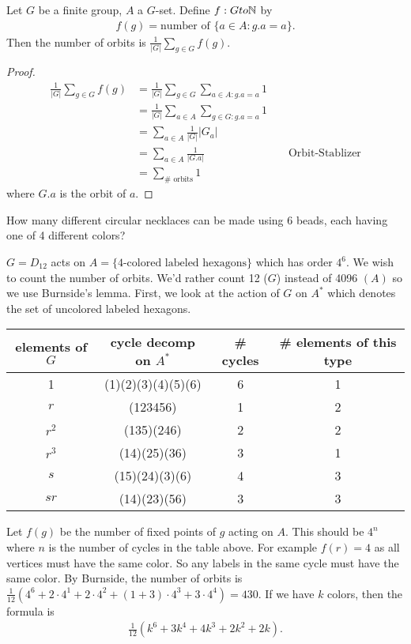\documentclass[12pt,class=article,crop=false]{standalone}
\begin{document}
\begin{lem}[Burnside]
Let $ G$ be a finite group,  $ A$ a $ G$-set. Define $ f: G to \mathbb{N}$ by
\begin{align*}
	f(g) = \text{number of } \{a \in A: g.a = a\}.  
\end{align*}
Then the number of orbits is $ \frac{1}{|G|} \sum_{g \in G} f(g)$.
\end{lem}
\begin{proof}
\begin{align*}
	\frac{1}{|G|} \sum_{g \in G} f(g) &= \frac{1}{|G|} \sum_{g \in G} \sum_{a \in A: g.a=a} 1\\
	&= \frac{1}{|G|} \sum_{a \in A} \sum_{g \in G: g.a=a} 1 \\
	&= \sum_{a \in A} \frac{1}{|G|} |G_a| \\
	&= \sum_{ a \in A} \frac{1}{|G.a|} && \text{ Orbit-Stablizer} \\
	&= \sum_{ \# \text{ orbits}} 1
\end{align*}
where $ G.a$ is the orbit of  $ a$.
\end{proof}

\begin{eg}[1]
How many different circular necklaces can be made using 6 beads, each having one of 4 different colors?

$ G= D_{12}$ acts on $ A= \{ \text{4-colored labeled hexagons} \} $ which has order $ 4^{6}$. We wish to count the number of orbits. We'd rather count 12 ($ G$) instead of 4096 $ (A)$ so we use Burnside's lemma. First, we look at the action of $ G$ on  $ A^* $ which denotes the set of uncolored labeled hexagons.
\begin{table}[H]
	\centering
	\begin{tabular}{c|c|c|c}
		elements of $ G$& cycle decomp on $ A^* $ & \# cycles & # elements of this type\\
		\hline
		\hline
		1&(1)(2)(3)(4)(5)(6)& 6 & 1\\
		\hline
		$ r$& (123456)&1&2\\
		\hline
		$ r^2$ & (135)(246) & 2 &2\\
		\hline
		$ r^3$ & (14)(25)(36) & 3&1\\
		\hline
		$ s$& (15)(24)(3)(6)&4&3\\
		\hline
		$ s r$ & (14)(23)(56) & 3 &3\\
	\end{tabular}
\end{table}
Let $ f(g)$ be the number of fixed points of  $ g$ acting on  $ A$. This should be $ 4^{n}$ where $ n$ is the number of cycles in the table above. For example  $ f(r) = 4$ as all vertices must have the same color. So any labels in the same cycle must have the same color. By Burnside, the number of orbits is  $ \frac{1}{12} (4^{6}+2 \cdot 4^{1}+ 2 \cdot 4^{2}+ (1+3) \cdot 4^3 + 3 \cdot 4^{4}) = 430$. If we have $ k$ colors, then the formula is
 \begin{align*}
	\frac{1}{12} (k^{6}+3k^{4}+4k^3+2k^2+2k).
\end{align*}
\end{eg}
\end{document}
